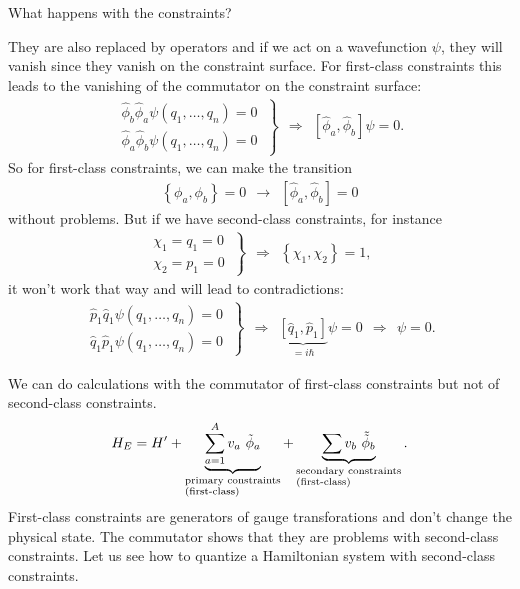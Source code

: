 What happens with the constraints? 

They are also replaced by operators and if we act on a wavefunction $\psi$, they will vanish since they vanish on the constraint surface. For first-class constraints this leads to the vanishing of the commutator on the constraint surface:
\begin{align}
\left.
\begin{array}{l}
\hat{\phi}_b \hat{\phi}_a \psi(q_1, \dots, q_n) = 0 \\
\hat{\phi}_a \hat{\phi}_b \psi(q_1, \dots, q_n) = 0
\end{array} \ \right \} \ \
\Longrightarrow \ \ \left[ \hat{\phi}_a ,\hat{\phi}_b \right] \psi = 0.
\end{align}
So for first-class constraints, we can make the transition
\begin{align}
\left \{ \phi_a ,\phi_b \right \} = 0 \ \ \longrightarrow \ \ \left[ \hat{\phi}_a ,\hat{\phi}_b \right] = 0
\end{align}
without problems. 
But if we have second-class constraints, for instance
\begin{align}
\left.
\begin{array}{l}
\chi_1 = q_1 = 0 \\
\chi_2 = p_1 = 0
\end{array} \ \right \} \ \
\Longrightarrow \ \ \left \{ \chi_1 ,\chi_2 \right \} = 1,
\end{align}
it won't work that way and will lead to contradictions:
\begin{align}
\left.
\begin{array}{l}
\hat{p}_1 \hat{q}_1 \psi(q_1, \dots, q_n) = 0 \\
\hat{q}_1 \hat{p}_1 \psi(q_1, \dots, q_n) = 0
\end{array} \ \right \} \ \
\Longrightarrow \ \ \underbrace{\left[ \hat{q}_1 ,\hat{p}_1 \right]}_{= i \hbar} \psi = 0 \ \ \Longrightarrow \ \ \psi = 0.
\end{align}

We can do calculations with the commutator of first-class constraints but not of second-class constraints. 
\begin{align}
H_E = H' + \underbrace{\sum_{a=1}^A v_a \  \tilde{\phi}_a}_{\begin{subarray}{l}\text{primary constraints}\\ \text{(first-class)}\end{subarray}} + \underbrace{\sum v_b \ \tilde{\tilde{\phi}}_b}_{\begin{subarray}{l}\text{secondary constraints}\\ \text{(first-class)}\end{subarray}}.
\end{align}
First-class constraints are generators of gauge transforations and don't change the physical state.
The commutator shows that they are problems with second-class constraints. Let us see how to quantize a Hamiltonian system with second-class constraints. 

